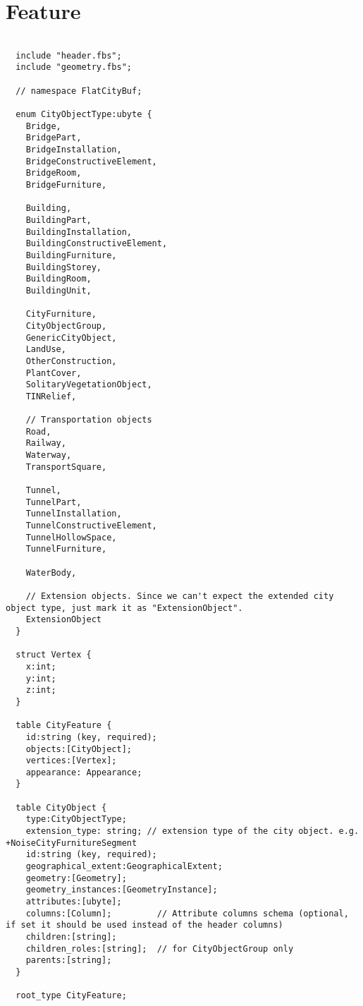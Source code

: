 \section{Feature}
\label{appendix:flatcitybuf_schema:feature}
\begin{lstlisting}[caption={Feature schema}, basicstyle=\small]

  include "header.fbs";
  include "geometry.fbs";

  // namespace FlatCityBuf;

  enum CityObjectType:ubyte {
    Bridge,
    BridgePart,
    BridgeInstallation,
    BridgeConstructiveElement,
    BridgeRoom,
    BridgeFurniture,

    Building,
    BuildingPart,
    BuildingInstallation,
    BuildingConstructiveElement,
    BuildingFurniture,
    BuildingStorey,
    BuildingRoom,
    BuildingUnit,

    CityFurniture,
    CityObjectGroup,
    GenericCityObject,
    LandUse,
    OtherConstruction,
    PlantCover,
    SolitaryVegetationObject,
    TINRelief,

    // Transportation objects
    Road,
    Railway,
    Waterway,
    TransportSquare,

    Tunnel,
    TunnelPart,
    TunnelInstallation,
    TunnelConstructiveElement,
    TunnelHollowSpace,
    TunnelFurniture,

    WaterBody,

    // Extension objects. Since we can't expect the extended city object type, just mark it as "ExtensionObject".
    ExtensionObject
  }

  struct Vertex {
    x:int;
    y:int;
    z:int;
  }

  table CityFeature {
    id:string (key, required);
    objects:[CityObject];
    vertices:[Vertex];
    appearance: Appearance;
  }

  table CityObject {
    type:CityObjectType;
    extension_type: string; // extension type of the city object. e.g. +NoiseCityFurnitureSegment
    id:string (key, required);
    geographical_extent:GeographicalExtent;
    geometry:[Geometry];
    geometry_instances:[GeometryInstance];
    attributes:[ubyte];
    columns:[Column];         // Attribute columns schema (optional, if set it should be used instead of the header columns)
    children:[string];
    children_roles:[string];  // for CityObjectGroup only
    parents:[string];
  }

  root_type CityFeature;
\end{lstlisting}